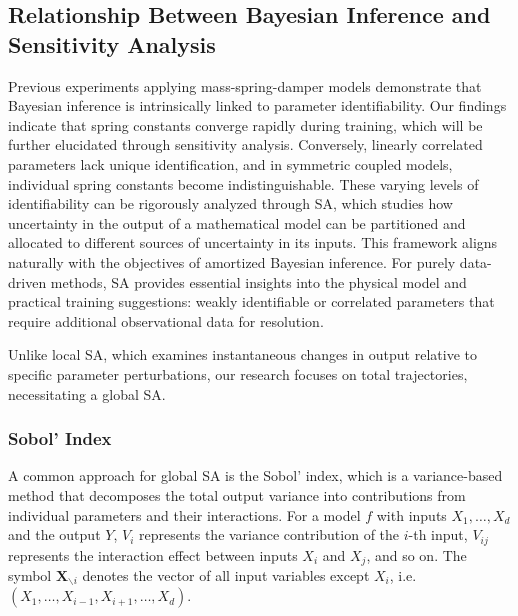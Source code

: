\subsection{Relationship Between Bayesian Inference and Sensitivity Analysis}
Previous experiments applying mass-spring-damper models demonstrate that Bayesian inference is intrinsically linked to parameter identifiability. Our findings indicate that spring constants converge rapidly during training, which will be further elucidated through sensitivity analysis. Conversely, linearly correlated parameters lack unique identification, and in symmetric coupled models, individual spring constants become indistinguishable. These varying levels of identifiability can be rigorously analyzed through \ac{SA}, which studies how uncertainty in the output of a mathematical model can be partitioned and allocated to different sources of uncertainty in its inputs. This framework aligns naturally with the objectives of amortized Bayesian inference. For purely data-driven methods, \ac{SA} provides essential insights into the physical model and practical training suggestions: weakly identifiable or correlated parameters that require additional observational data for resolution.

Unlike local \ac{SA}, which examines instantaneous changes in output relative to specific parameter perturbations, our research focuses on total trajectories, necessitating a global \ac{SA}. 

\subsubsection{Sobol' Index}
A common approach for global \ac{SA} is the Sobol' index, which is a variance-based method that decomposes the total output variance into contributions from individual parameters and their interactions. For a model $f$ with inputs $X_1, \ldots, X_d$ and the output $Y$, $V_i$ represents the variance contribution of the $i$-th input, $V_{ij}$ represents the interaction effect between inputs $X_i$ and $X_j$, and so on. The symbol $\boldsymbol{X}_{\backslash i}$ denotes the vector of all input variables except $X_i$, i.e. $(X_1,\ldots,X_{i-1},X_{i+1},\ldots,X_d)$.   

